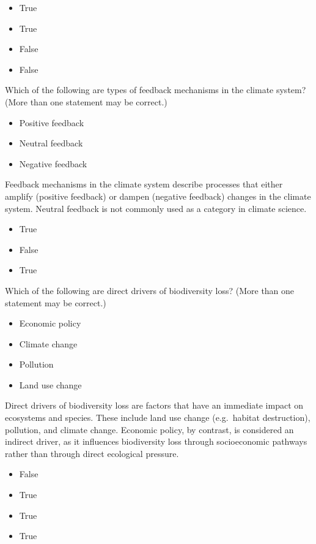 \documentclass[
  a4paper,
  DIV=11,
  numbers=noendperiod,
  oneside,
  openany]{scrreprt}
\providecommand{\tightlist}{%
  \setlength{\itemsep}{0pt}\setlength{\parskip}{0pt}}
\begin{document}
\begin{itemize}
\tightlist
\item
  True
\item
  True
\item
  False
\item
  False
\end{itemize}

Which of the following are types of feedback mechanisms in the climate
system? (More than one statement may be correct.)

\begin{itemize}
\tightlist
\item[$\square$]
  Positive feedback
\item[$\square$]
  Neutral feedback
\item[$\square$]
  Negative feedback
\end{itemize}

Feedback mechanisms in the climate system describe processes that either
amplify (positive feedback) or dampen (negative feedback) changes in the
climate system. Neutral feedback is not commonly used as a category in
climate science.

\begin{itemize}
\tightlist
\item
  True
\item
  False
\item
  True
\end{itemize}

Which of the following are direct drivers of biodiversity loss? (More
than one statement may be correct.)

\begin{itemize}
\tightlist
\item[$\square$]
  Economic policy
\item[$\square$]
  Climate change
\item[$\square$]
  Pollution
\item[$\square$]
  Land use change
\end{itemize}

Direct drivers of biodiversity loss are factors that have an immediate
impact on ecosystems and species. These include land use change
(e.g.~habitat destruction), pollution, and climate change. Economic
policy, by contrast, is considered an indirect driver, as it influences
biodiversity loss through socioeconomic pathways rather than through
direct ecological pressure.

\begin{itemize}
\tightlist
\item
  False
\item
  True
\item
  True
\item
  True
\end{itemize}
\end{document}
